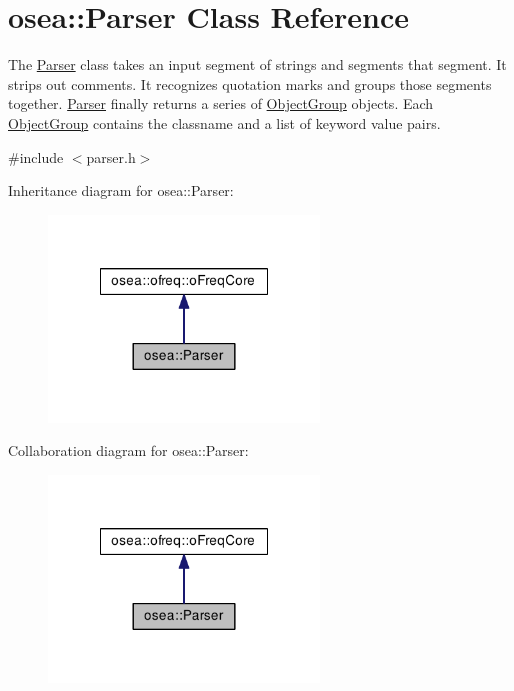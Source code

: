 \hypertarget{classosea_1_1_parser}{\section{osea\-:\-:Parser Class Reference}
\label{classosea_1_1_parser}
}


The \hyperlink{classosea_1_1_parser}{Parser} class takes an input segment of strings and segments that segment. It strips out comments. It recognizes quotation marks and groups those segments together. \hyperlink{classosea_1_1_parser}{Parser} finally returns a series of \hyperlink{classosea_1_1_object_group}{Object\-Group} objects. Each \hyperlink{classosea_1_1_object_group}{Object\-Group} contains the classname and a list of keyword value pairs.  




{\ttfamily \#include $<$parser.\-h$>$}



Inheritance diagram for osea\-:\-:Parser\-:
\nopagebreak
\begin{figure}[H]
\begin{center}
\leavevmode
\includegraphics[width=204pt]{classosea_1_1_parser__inherit__graph}
\end{center}
\end{figure}


Collaboration diagram for osea\-:\-:Parser\-:
\nopagebreak
\begin{figure}[H]
\begin{center}
\leavevmode
\includegraphics[width=204pt]{classosea_1_1_parser__coll__graph}
\end{center}
\end{figure}
